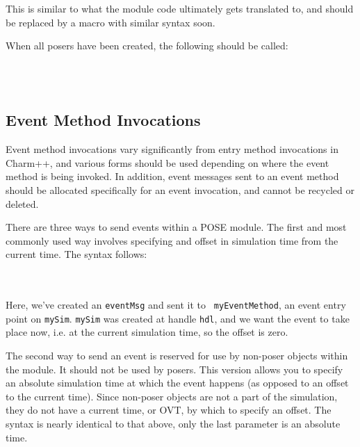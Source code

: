 \documentclass[10pt]{article}
\begin{document}
This is similar to what the module code ultimately gets translated to,
and should be replaced by a macro with similar syntax soon.

When all posers have been created, the following should be called:

~\\
\\

\subsection{Event Method Invocations}

Event method invocations vary significantly from entry method
invocations in Charm++, and various forms should be used depending on
where the event method is being invoked.  In addition, event messages
sent to an event method should be allocated specifically for an event
invocation, and cannot be recycled or deleted.

There are three ways to send events within a POSE module.  The first
and most commonly used way involves specifying and offset in
simulation time from the current time.  The syntax follows:

~\\
\\

Here, we've created an {\tt eventMsg} and sent it to {\tt
myEventMethod}, an event entry point on {\tt mySim}.  {\tt mySim} was
created at handle {\tt hdl}, and we want the event to take place now,
i.e. at the current simulation time, so the offset is zero.  

The second way to send an event is reserved for use by non-poser
objects within the module.  It should not be used by posers.  This
version allows you to specify an absolute simulation time at which the
event happens (as opposed to an offset to the current time).  Since
non-poser objects are not a part of the simulation, they do not have a
current time, or OVT, by which to specify an offset.  The syntax is
nearly identical to that above, only the last parameter is an absolute
time.

~\\
\\
\end{document}
